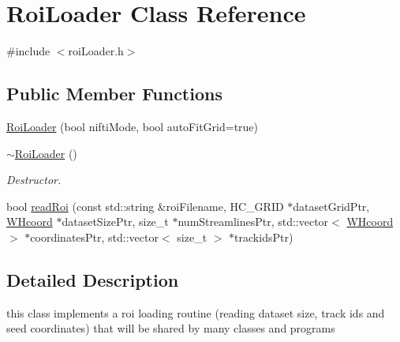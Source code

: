 \hypertarget{classRoiLoader}{\section{\-Roi\-Loader \-Class \-Reference}
\label{classRoiLoader}
}


{\ttfamily \#include $<$roi\-Loader.\-h$>$}

\subsection*{\-Public \-Member \-Functions}
\begin{DoxyCompactItemize}
\item 
\hyperlink{classRoiLoader_a539c93d64f31a013bf81e3b5bb912608}{\-Roi\-Loader} (bool nifti\-Mode, bool auto\-Fit\-Grid=true)
\item 
\hypertarget{classRoiLoader_a08932453bc8845e2520e11c7d5e2c110}{\hyperlink{classRoiLoader_a08932453bc8845e2520e11c7d5e2c110}{$\sim$\-Roi\-Loader} ()}\label{classRoiLoader_a08932453bc8845e2520e11c7d5e2c110}

\begin{DoxyCompactList}\small\item\em \-Destructor. \end{DoxyCompactList}\item 
bool \hyperlink{classRoiLoader_a1a4ec19f0cf458d4892f9c312b66e431}{read\-Roi} (const std\-::string \&roi\-Filename, \-H\-C\-\_\-\-G\-R\-I\-D $\ast$dataset\-Grid\-Ptr, \hyperlink{classWHcoord}{\-W\-Hcoord} $\ast$dataset\-Size\-Ptr, size\-\_\-t $\ast$num\-Streamlines\-Ptr, std\-::vector$<$ \hyperlink{classWHcoord}{\-W\-Hcoord} $>$ $\ast$coordinates\-Ptr, std\-::vector$<$ size\-\_\-t $>$ $\ast$trackids\-Ptr)
\end{DoxyCompactItemize}


\subsection{\-Detailed \-Description}
this class implements a roi loading routine (reading dataset size, track ids and seed coordinates) that will be shared by many classes and programs 

